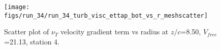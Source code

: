 \begin{figure}[H]
\centering
\texttt{[image: figs/run\_34/run\_34\_turb\_visc\_ettap\_bot\_vs\_r\_meshscatter]}
\caption{Scatter plot of $\nu_T$ velocity gradient term vs radius at $z/c$=8.50, $V_{free}$=21.13, station 4.}
\label{fig:run_34_turb_visc_ettap_bot_vs_r_meshscatter}
\end{figure}


